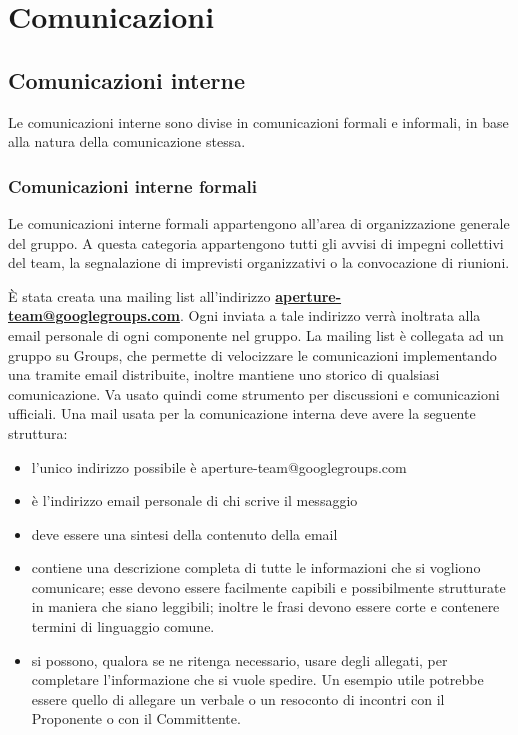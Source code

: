 \newpage
\section{Comunicazioni}
\label{3.0}

\subsection{Comunicazioni interne}
\label{3.2}
Le comunicazioni interne sono divise in comunicazioni formali e informali, in base alla natura della comunicazione stessa.

\subsubsection{Comunicazioni interne formali}
Le comunicazioni interne formali appartengono all'area di organizzazione generale del gruppo. A questa categoria appartengono tutti gli avvisi di impegni collettivi del team, la segnalazione di imprevisti organizzativi o la convocazione di riunioni.

\label{3.2.2}
È stata creata una mailing list all'indirizzo \textbf{\url{aperture-team@googlegroups.com}}.
Ogni  inviata a tale indirizzo verrà inoltrata alla email personale di ogni componente nel gruppo.
La mailing list è collegata ad un gruppo su  Groups, che permette di velocizzare le comunicazioni implementando una  tramite email distribuite, inoltre mantiene uno storico di qualsiasi comunicazione. Va usato quindi come strumento per discussioni e comunicazioni ufficiali. 
Una mail usata per la comunicazione interna deve avere la seguente struttura:
\begin{itemize}
\item {} l'unico indirizzo possibile è aperture-team@googlegroups.com
\item {} è l'indirizzo email personale di chi scrive il messaggio
\item {} deve essere una sintesi della contenuto della email
\item {} contiene una descrizione completa di tutte le informazioni che si vogliono comunicare; esse devono essere facilmente capibili e possibilmente strutturate in maniera che siano leggibili; inoltre le frasi devono essere corte e contenere termini di linguaggio comune.
\item {} si possono, qualora se ne ritenga necessario, usare degli allegati, per completare l'informazione che si vuole spedire. Un esempio utile potrebbe essere quello di allegare un verbale o un resoconto di incontri con il Proponente  o con il Committente.
\end{itemize}



